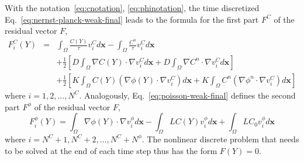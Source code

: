 With the notation~\eqref{eq:cnotation}, \eqref{eq:phinotation}, the time discretized 
Eq.~\eqref{eq:nernst-planck-weak-final} leads to the formula for the 
first part $F^C$ of the residual vector $F$,
\begin{eqnarray}
  F_i^C\left(Y\right) & = & \int_{\Omega} \frac{C(Y)}{\tau}v_i^C d\mathbf{x} - 
  \int_{\Omega} \frac{C^{n}}{\tau}v_i^C d\mathbf{x}\nonumber\\
  &&+\frac 12 \left[D\int_{\Omega} \nabla C(Y) \cdot \nabla v_i^C d\mathbf{x}+ 
  	D\int_{\Omega} \nabla C^{n} \cdot \nabla v_i^C d\mathbf{x}\right]\nonumber\\
  &&+ \frac 12 \left[K\int_{\Omega}C(Y) \left(\nabla \phi(Y) \cdot \nabla v_i^C\right) d\mathbf{x}+
  K\int_{\Omega}C^{n} \left(\nabla \phi^{n} \cdot \nabla v_i^C\right) d\mathbf{x}\right]\label{eq:Fc}
\end{eqnarray}
where $i = 1, 2, \ldots, N^C$.
Analogously, Eq.~\eqref{eq:poisson-weak-final} defines the second part $F^{\phi}$ 
of the residual vector $F$,
\begin{equation}
  F_i^{\phi}\left(Y\right) = \int_{\Omega} \nabla \phi(Y) \cdot \nabla v_i^{\phi} d\mathbf{x} 
  - \int_{\Omega} LC(Y)v_i^{\phi} d\mathbf{x} + \int_{\Omega} LC_0 v_i^{\phi} d\mathbf{x}
  \label{eq:Fphi}
\end{equation}
where $i = N^C + 1, N^C + 2, \ldots, N^C + N^{\phi}$. The nonlinear discrete problem 
that needs to be solved at the end of each time step thus has the form 
$F(Y) = 0$.

\newpage

